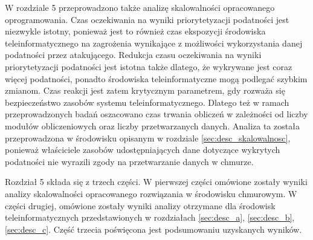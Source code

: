 \bigbreak
W rozdziale 5 przeprowadzono także analizę skalowalności opracowanego oprogramowania. Czas oczekiwania na wyniki priorytetyzacji podatności jest niezwykle istotny, ponieważ jest to również czas ekspozycji środowiska teleinformatycznego na zagrożenia wynikające z możliwości wykorzystania danej podatności przez atakującego. Redukcja czasu oczekiwania na wyniki priorytetyzacji podatności jest istotna także dlatego, że wykrywane jest coraz więcej podatności, ponadto środowiska teleinformatyczne mogą podlegać szybkim zmianom. Czas reakcji jest zatem krytycznym parametrem, gdy rozważa się bezpieczeństwo zasobów systemu teleinformatycznego. Dlatego też w ramach przeprowadzonych badań oszacowano czas trwania obliczeń w zależności od liczby modułów obliczeniowych oraz liczby przetwarzanych danych. Analiza ta została przeprowadzona w środowisku opisanym w rozdziale \ref{sec:desc_skalowalnosc}, ponieważ właściciele zasobów udostępniających dane dotyczące wykrytych podatności nie wyrazili zgody na przetwarzanie danych w chmurze.

\bigbreak
Rozdział 5 składa się z trzech części. W pierwszej części omówione zostały wyniki analizy skalowalności opracowanego rozwiązania w środowisku chmurowym. W części drugiej, omówione zostały wyniki analizy otrzymane dla środowisk teleinformatycznych przedstawionych w rozdziałach \ref{sec:desc_a}, \ref{sec:desc_b}, \ref{sec:desc_c}. Część trzecia poświęcona jest podsumowaniu uzyskanych wyników.



